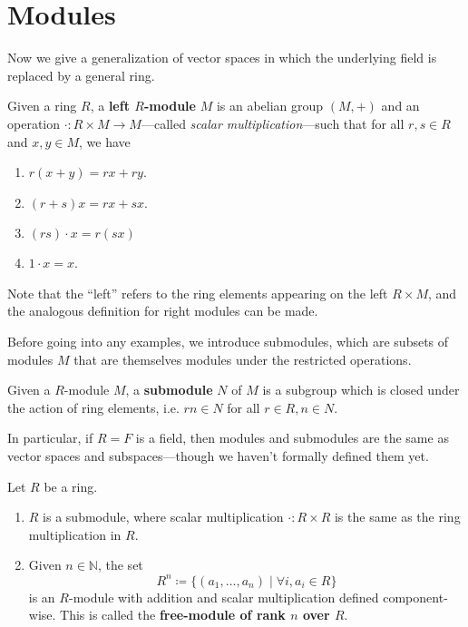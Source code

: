 \section{Modules} 

  Now we give a generalization of vector spaces in which the underlying field is replaced by a general ring. 

  \begin{definition}[Module]
    Given a ring $R$, a \textbf{left $R$-module} $M$ is an abelian group $(M, +)$ and an operation $\cdot: R \times M \to M$---called \textit{scalar multiplication}---such that for all $r, s \in R$ and $x, y \in M$, we have 
    \begin{enumerate}
      \item $r (x + y) = rx + ry$. 
      \item $(r + s) x = rx + sx$. 
      \item $(rs) \cdot x = r(sx)$ 
      \item $1 \cdot x = x$. 
    \end{enumerate}
    Note that the ``left'' refers to the ring elements appearing on the left $R \times M$, and the analogous definition for right modules can be made. 
  \end{definition}

  Before going into any examples, we introduce submodules, which are subsets of modules $M$ that are themselves modules under the restricted operations. 

  \begin{definition}[Submodule]
    Given a $R$-module $M$, a \textbf{submodule} $N$ of $M$ is a subgroup which is closed under the action of ring elements, i.e. $rn \in N$ for all $r \in R, n \in N$. 
  \end{definition}

  In particular, if $R = F$ is a field, then modules and submodules are the same as vector spaces and subspaces---though we haven't formally defined them yet. 

  \begin{example}[Modules]
    Let $R$ be a ring. 
    \begin{enumerate}
      \item $R$ is a submodule, where scalar multiplication $\cdot : R \times R$ is the same as the ring multiplication in $R$. 
      \item Given $n \in \mathbb{N}$, the set 
        \begin{equation}
          R^n \coloneqq \{(a_1, \ldots, a_n) \mid \forall i, a_i \in R \} 
        \end{equation}
        is an $R$-module with addition and scalar multiplication defined component-wise. This is called the \textbf{free-module of rank $n$ over $R$}. 
    \end{enumerate}
  \end{example}

